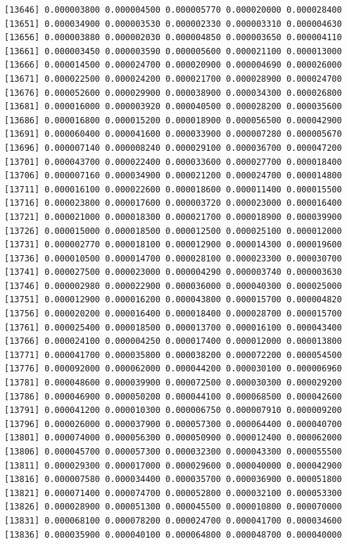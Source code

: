 \documentclass[]{article}
\begin{document}
\begin{verbatim}
[13646] 0.000003800 0.000004500 0.000005770 0.000020000 0.000028400
[13651] 0.000034900 0.000003530 0.000002330 0.000003310 0.000004630
[13656] 0.000003880 0.000002030 0.000004850 0.000003650 0.000004110
[13661] 0.000003450 0.000003590 0.000005600 0.000021100 0.000013000
[13666] 0.000014500 0.000024700 0.000020900 0.000004690 0.000026000
[13671] 0.000022500 0.000024200 0.000021700 0.000028900 0.000024700
[13676] 0.000052600 0.000029900 0.000038900 0.000034300 0.000026800
[13681] 0.000016000 0.000003920 0.000040500 0.000028200 0.000035600
[13686] 0.000016800 0.000015200 0.000018900 0.000056500 0.000042900
[13691] 0.000060400 0.000041600 0.000033900 0.000007280 0.000005670
[13696] 0.000007140 0.000008240 0.000029100 0.000036700 0.000047200
[13701] 0.000043700 0.000022400 0.000033600 0.000027700 0.000018400
[13706] 0.000007160 0.000034900 0.000021200 0.000024700 0.000014800
[13711] 0.000016100 0.000022600 0.000018600 0.000011400 0.000015500
[13716] 0.000023800 0.000017600 0.000003720 0.000023000 0.000016400
[13721] 0.000021000 0.000018300 0.000021700 0.000018900 0.000039900
[13726] 0.000015000 0.000018500 0.000012500 0.000025100 0.000012000
[13731] 0.000002770 0.000018100 0.000012900 0.000014300 0.000019600
[13736] 0.000010500 0.000014700 0.000028100 0.000023300 0.000030700
[13741] 0.000027500 0.000023000 0.000004290 0.000003740 0.000003630
[13746] 0.000002980 0.000022900 0.000036000 0.000040300 0.000025000
[13751] 0.000012900 0.000016200 0.000043800 0.000015700 0.000004820
[13756] 0.000020200 0.000016400 0.000018400 0.000028700 0.000015700
[13761] 0.000025400 0.000018500 0.000013700 0.000016100 0.000043400
[13766] 0.000024100 0.000004250 0.000017400 0.000012000 0.000013800
[13771] 0.000041700 0.000035800 0.000038200 0.000072200 0.000054500
[13776] 0.000092000 0.000062000 0.000044200 0.000030100 0.000006960
[13781] 0.000048600 0.000039900 0.000072500 0.000030300 0.000029200
[13786] 0.000046900 0.000050200 0.000044100 0.000068500 0.000042600
[13791] 0.000041200 0.000010300 0.000006750 0.000007910 0.000009200
[13796] 0.000026000 0.000037900 0.000057300 0.000064400 0.000040700
[13801] 0.000074000 0.000056300 0.000050900 0.000012400 0.000062000
[13806] 0.000045700 0.000057300 0.000032300 0.000043300 0.000055500
[13811] 0.000029300 0.000017000 0.000029600 0.000040000 0.000042900
[13816] 0.000007580 0.000034400 0.000035700 0.000036900 0.000051800
[13821] 0.000071400 0.000074700 0.000052800 0.000032100 0.000053300
[13826] 0.000028900 0.000051300 0.000045500 0.000010800 0.000070000
[13831] 0.000068100 0.000078200 0.000024700 0.000041700 0.000034600
[13836] 0.000035900 0.000040100 0.000064800 0.000048700 0.000040000

\end{verbatim}
\end{document}
